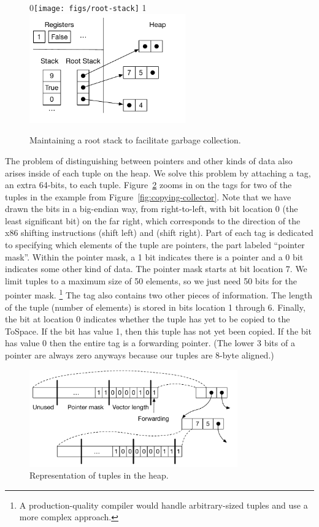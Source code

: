 \documentclass[7x10,nocrop]{TimesAPriori_MIT}%
\def\racketEd{0}
\def\pythonEd{1}
\def\edition{0}
\newcommand{\racket}[1]{{\if\edition\racketEd{#1}\fi}}
\newcommand{\python}[1]{{\if\edition\pythonEd #1\fi}}
\begin{document}
\begin{figure}[tbp]
  \centering
  \racket{\texttt{[image: figs/root-stack]}}
  \python{\includegraphics[width=0.60\textwidth]{figs/root-stack-python}}
\caption{Maintaining a root stack to facilitate garbage collection.}
\label{fig:shadow-stack}
\end{figure}

The problem of distinguishing between pointers and other kinds of data
also arises inside of each tuple on the heap. We solve this problem by
attaching a tag, an extra 64-bits, to each
tuple. Figure~\ref{fig:tuple-rep} zooms in on the tags for two of the
tuples in the example from Figure~\ref{fig:copying-collector}. Note
that we have drawn the bits in a big-endian way, from right-to-left,
with bit location 0 (the least significant bit) on the far right,
which corresponds to the direction of the x86 shifting instructions
 (shift left) and  (shift right). Part of each tag
is dedicated to specifying which elements of the tuple are pointers,
the part labeled ``pointer mask''. Within the pointer mask, a 1 bit
indicates there is a pointer and a 0 bit indicates some other kind of
data. The pointer mask starts at bit location 7. We limit tuples to a
maximum size of 50 elements, so we just need 50 bits for the pointer
mask.%
%
\footnote{A production-quality compiler would handle
arbitrary-sized tuples and use a more complex approach.}
%
The tag also contains two other pieces of information. The length of
the tuple (number of elements) is stored in bits location 1 through
6. Finally, the bit at location 0 indicates whether the tuple has yet
to be copied to the ToSpace.  If the bit has value 1, then this tuple
has not yet been copied.  If the bit has value 0 then the entire tag
is a forwarding pointer. (The lower 3 bits of a pointer are always
zero anyways because our tuples are 8-byte aligned.)

\begin{figure}[tbp]
\centering \includegraphics[width=0.8\textwidth]{figs/tuple-rep}
\caption{Representation of tuples in the heap.}
\label{fig:tuple-rep}
\end{figure}
\end{document}
